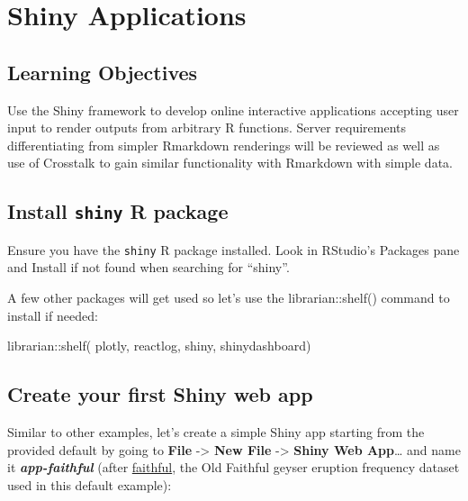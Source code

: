 \documentclass[
  letterpaper,
  DIV=11,
  numbers=noendperiod]{scrreprt}
\newenvironment{Shaded}{\begin{snugshade}}{\end{snugshade}}
\newcommand{\FunctionTok}[1]{\textcolor[rgb]{0.28,0.35,0.67}{#1}}
\newcommand{\NormalTok}[1]{\textcolor[rgb]{0.00,0.23,0.31}{#1}}
\newcommand{\SpecialCharTok}[1]{\textcolor[rgb]{0.37,0.37,0.37}{#1}}
\begin{document}

\hypertarget{shiny-applications}{%
\chapter{Shiny Applications}\label{shiny-applications}}

\hypertarget{learning-objectives}{%
\section*{Learning Objectives}\label{learning-objectives}}


Use the Shiny framework to develop online interactive applications
accepting user input to render outputs from arbitrary R functions.
Server requirements differentiating from simpler Rmarkdown renderings
will be reviewed as well as use of Crosstalk to gain similar
functionality with Rmarkdown with simple data.

\hypertarget{install-shiny-r-package}{%
\section{\texorpdfstring{Install \texttt{shiny} R
package}{Install shiny R package}}\label{install-shiny-r-package}}

Ensure you have the \texttt{shiny} R package installed. Look in
RStudio's Packages pane and Install if not found when searching for
``shiny''.

A few other packages will get used so let's use the librarian::shelf()
command to install if needed:

\begin{Shaded}
\begin{Highlighting}[]
\NormalTok{librarian}\SpecialCharTok{::}\FunctionTok{shelf}\NormalTok{(}
\NormalTok{  plotly, reactlog, shiny, shinydashboard)}
\end{Highlighting}
\end{Shaded}

\hypertarget{create-your-first-shiny-web-app}{%
\section{Create your first Shiny web
app}\label{create-your-first-shiny-web-app}}

Similar to other examples, let's create a simple Shiny app starting from
the provided default by going to \textbf{File} -\textgreater{}
\textbf{New File} -\textgreater{} \textbf{Shiny Web App}\ldots{} and
name it \textbf{\emph{app-faithful}} (after
\href{https://www.rdocumentation.org/packages/datasets/versions/3.6.2/topics/faithful}{faithful},
the Old Faithful geyser eruption frequency dataset used in this default
example):
\end{document}
